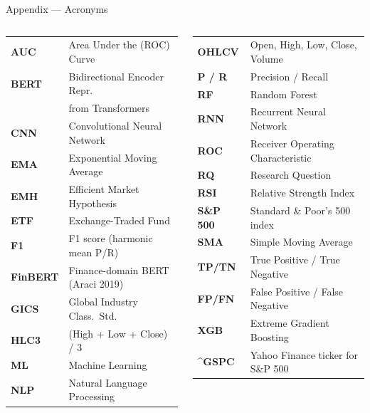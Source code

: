 \documentclass[aspectratio=169,11pt]{beamer}
\begin{document}
\begin{frame}{Appendix --- Acronyms}
\footnotesize
\begin{columns}[T,onlytextwidth]
\renewcommand{\arraystretch}{1.05}
\begin{tabular}{@{}l l@{}}
\textbf{AUC}    & Area Under the (ROC) Curve \\
\textbf{BERT}   & Bidirectional Encoder Repr. \\
                & from Transformers \\
\textbf{CNN}    & Convolutional Neural Network \\
\textbf{EMA}    & Exponential Moving Average \\
\textbf{EMH}    & Efficient Market Hypothesis \\
\textbf{ETF}    & Exchange-Traded Fund \\
\textbf{F1}     & F1 score (harmonic mean P/R) \\
\textbf{FinBERT}& Finance-domain BERT (Araci 2019) \\
\textbf{GICS}   & Global Industry Class.\ Std. \\
\textbf{HLC3}   & (High + Low + Close) / 3 \\
\textbf{ML}     & Machine Learning \\
\textbf{NLP}    & Natural Language Processing \\
\end{tabular}

\renewcommand{\arraystretch}{1.05}
\begin{tabular}{@{}l l@{}}
\textbf{OHLCV}  & Open, High, Low, Close, Volume \\
\textbf{P / R}  & Precision / Recall \\
\textbf{RF}     & Random Forest \\
\textbf{RNN}    & Recurrent Neural Network \\
\textbf{ROC}    & Receiver Operating Characteristic \\
\textbf{RQ}     & Research Question \\
\textbf{RSI}    & Relative Strength Index \\
\textbf{S\&P 500} & Standard \& Poor's 500 index \\
\textbf{SMA}    & Simple Moving Average \\
\textbf{TP/TN}& True Positive / True Negative \\
\textbf{FP/FN}& False Positive / False Negative \\
\textbf{XGB}    & Extreme Gradient Boosting \\
\textbf{\^{}GSPC} & Yahoo Finance ticker for S\&P 500 \\
\end{tabular}
\end{columns}
\end{frame}
\end{document}
